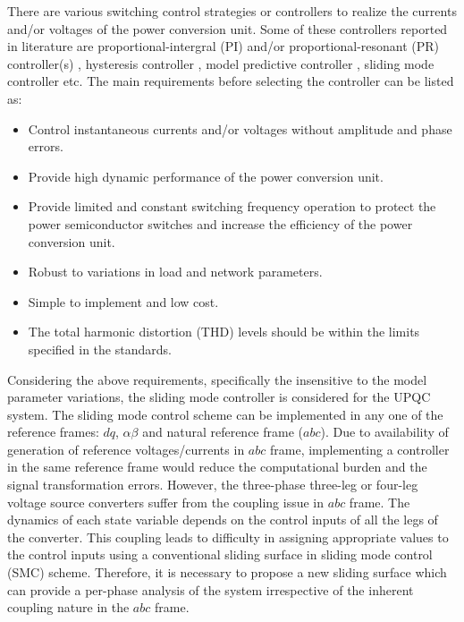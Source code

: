  There are various switching control strategies or controllers to realize the currents and/or voltages of the power conversion unit. 
 Some of these controllers reported in literature are proportional-intergral (PI) and/or proportional-resonant (PR) controller(s) \cite{8170301,8345740,4305325,1629027, 5398914, 6880399}, hysteresis controller \cite{4158027,malesani1990novel,8846889}, model predictive controller \cite{6939709,9175195}, sliding mode controller \cite{9108551,8264745,6563653,7776961,9264672,8466115,7506128} etc. The main requirements before selecting the controller can be listed as:
 \begin{itemize}
 \item Control instantaneous currents and/or voltages without amplitude and phase errors.
 \item Provide high dynamic performance of the power conversion unit.
 \item Provide limited and constant switching frequency operation to protect the power semiconductor switches and increase the efficiency of the power conversion unit.
 \item Robust to variations in load and network parameters. 
 \item Simple to implement and low cost.
 \item The total harmonic distortion (THD) levels should be within the limits specified in the standards.
 \end{itemize}
 Considering the above requirements, specifically the insensitive to the model parameter variations, the sliding mode controller is considered for the UPQC system. The sliding mode control scheme can be implemented in any one of the reference frames: $dq$, $\alpha \beta$ and natural reference frame ($abc$). Due to availability of generation of reference voltages/currents in $abc$ frame, implementing a controller in the same reference frame would reduce the computational burden and the signal transformation errors. However, the three-phase three-leg or four-leg voltage source converters suffer from the coupling issue in $abc$ frame. The dynamics of each state variable depends on the control inputs of all the legs of the converter. This coupling leads to difficulty in assigning appropriate values to the control inputs using a conventional sliding surface in sliding mode control (SMC) scheme. Therefore, it is necessary to propose a new sliding surface which can provide a per-phase analysis of the system irrespective of the inherent coupling nature in the $abc$ frame. 
 
